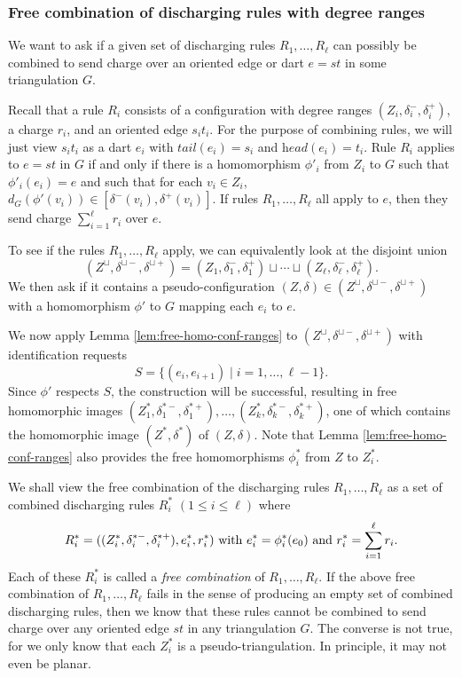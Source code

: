 \documentclass[10pt,a4paper]{article}
\def\head{\textit{head}}
\def\tail{\textit{tail}}
\begin{document}
\subsubsection{Free combination of discharging rules with degree ranges}
\label{subsub:combine_rules}

We want to ask if
a given set of discharging rules 
$R_1,\ldots,R_\ell$ can possibly be combined to 
send charge over an oriented edge or dart $e=st$ in some triangulation $G$. 

Recall that a rule $R_i$ consists of a configuration with degree ranges $(Z_i,\delta^-_i,\delta^+_i)$, a charge $r_i$, and an oriented edge $s_it_i$. For the purpose of
combining rules, we will just view $s_it_i$ as a dart $e_i$ with $\tail(e_i)=s_i$ and $\head(e_i)=t_i$. Rule $R_i$ applies to $e=st$ in $G$ if and only if there is a homomorphism
$\phi'_i$ from $Z_i$ to $G$ such that $\phi'_i(e_i)=e$ and such that for each $v_i\in Z_i$,             $d_G(\phi'(v_i))\in [\delta^-(v_i),\delta^+(v_i)]$. If rules $R_1,\ldots,R_\ell$ all apply to $e$, then they
send charge $\sum_{i=1}^\ell r_i$ over $e$. 

To see if the rules $R_1,\ldots,R_\ell$ apply, we can equivalently look at the disjoint union
\[(Z^\sqcup,\delta^{\sqcup-},\delta^{\sqcup+})= (Z_1,\delta^-_1,\delta^+_1)\sqcup\cdots\sqcup(Z_\ell,\delta^-_\ell,\delta^+_\ell).\]
We then ask if it contains
a pseudo-configuration 
$(Z,\delta)\in (Z^\sqcup,\delta^{\sqcup-},\delta^{\sqcup+})$
with a homomorphism
$\phi'$ to $G$ mapping each $e_i$ to $e$. 

We now apply Lemma \ref{lem:free-homo-conf-ranges} to $(Z^\sqcup,\delta^{\sqcup-},\delta^{\sqcup+})$ with identification requests 
\[S=\{(e_i,e_{i+1})\mid i=1,\dots,\ell-1\}.\]
Since $\phi'$ respects 
$S$, the construction will be successful, resulting in free homomorphic images  
$(Z_1^*,\delta^{*-}_1,\delta^{*+}_1),\ldots,(Z_k^*,\delta^{*-}_k,\delta^{*+}_k)$, one of which contains the homomorphic image $(Z^*,\delta^*)$ of $(Z,\delta)$. Note that 
Lemma \ref{lem:free-homo-conf-ranges} also provides the free homomorphisms $\phi^*_i$ from $Z$ to $Z^*_i$.

We shall view the free combination of the discharging rules $R_1,\ldots,R_\ell$
as a set of 
combined discharging rules $R^*_i$ $(1\le i \le \ell)$ where
\[R^*_i = ((Z_i^*,\delta^{*-}_i,\delta^{*+}_i),e^*_i,r^*_i)\textnormal{ with } e^*_i = \phi_i^*(e_0)\textnormal{ and }r^*_i=\sum_{i=1}^\ell r_i.\]
Each of these $R^*_i$ is called a \emph{free combination} of $R_1,\ldots,R_\ell$.
If the above free combination of $R_1,\ldots,R_\ell$ fails in the sense of producing an empty set of combined discharging rules, then we know 
that these rules cannot be combined to send charge over any oriented edge $st$ in any triangulation $G$.
The converse is not true, for we only know that each $Z^*_i$ is a pseudo-triangulation. In principle, it may not even be planar.
\end{document}
